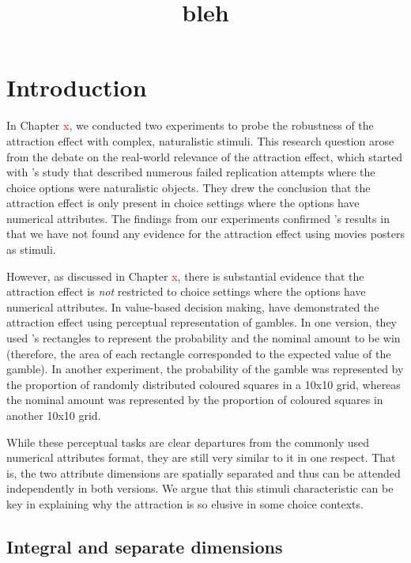 \documentclass[11pt,a4paper]{article}
\date{}
\title{\huge{bleh}}
\begin{document}
\maketitle


\section{Introduction} 

In Chapter \textcolor{red}{x}, we conducted two experiments to probe the robustness of the attraction effect with complex, naturalistic stimuli. This research question arose from the debate on the real-world relevance of the attraction effect, which started with \citeauthor{Frederick2014a}'s study that described numerous failed replication attempts where the choice options were naturalistic objects. They drew the conclusion that the attraction effect is only present in choice settings where the options have numerical attributes. The findings from our experiments confirmed \citeauthor{Frederick2014a}'s results in that we have not found any evidence for the attraction effect using movies posters as stimuli.

However, as discussed in Chapter \textcolor{red}{x}, there is substantial evidence that the attraction effect is \textit{not} restricted to choice settings where the options have numerical attributes. In value-based decision making,  have demonstrated the attraction effect using perceptual representation of gambles. In one version, they used \citeauthor{Trueblood2013}'s rectangles to represent the probability and the nominal amount to be win (therefore, the area of each rectangle corresponded to the expected value of the gamble). In another experiment, the probability of the gamble was represented by the proportion of randomly distributed coloured squares in a 10x10 grid, whereas the nominal amount was represented by the proportion of coloured squares in another 10x10 grid. 

While these perceptual tasks are clear departures from the commonly used numerical attributes format, they are still very similar to it in one respect. That is, the two attribute dimensions are spatially separated and thus can be attended independently in both versions. We argue that this stimuli characteristic can be key in explaining why the attraction is so elusive in some choice contexts.

\subsection{Integral and separate dimensions} 
\end{document}

